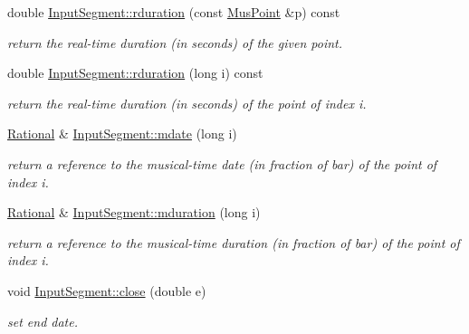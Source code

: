 \begin{DoxyCompactItemize}
\mbox{\label{group__segment_ga5ce66f635c2ab912e0ec9662c5c2ceaf}} 
double \mbox{\hyperlink{group__segment_ga5ce66f635c2ab912e0ec9662c5c2ceaf}{Input\+Segment\+::rduration}} (const \mbox{\hyperlink{classMusPoint}{Mus\+Point}} \&p) const
\begin{DoxyCompactList}\small\item\em return the real-\/time duration (in seconds) of the given point. \end{DoxyCompactList}\item 
\mbox{\label{group__segment_gafbf05e143d416de49180d2f18a53977b}} 
double \mbox{\hyperlink{group__segment_gafbf05e143d416de49180d2f18a53977b}{Input\+Segment\+::rduration}} (long i) const
\begin{DoxyCompactList}\small\item\em return the real-\/time duration (in seconds) of the point of index i. \end{DoxyCompactList}\item 
\mbox{\label{group__segment_ga6fce03f54fe517cc9541ea446cd26a50}} 
\mbox{\hyperlink{classRational}{Rational}} \& \mbox{\hyperlink{group__segment_ga6fce03f54fe517cc9541ea446cd26a50}{Input\+Segment\+::mdate}} (long i)
\begin{DoxyCompactList}\small\item\em return a reference to the musical-\/time date (in fraction of bar) of the point of index i. \end{DoxyCompactList}\item 
\mbox{\label{group__segment_ga2c16ef8a681bf9fded1dba29c1a84342}} 
\mbox{\hyperlink{classRational}{Rational}} \& \mbox{\hyperlink{group__segment_ga2c16ef8a681bf9fded1dba29c1a84342}{Input\+Segment\+::mduration}} (long i)
\begin{DoxyCompactList}\small\item\em return a reference to the musical-\/time duration (in fraction of bar) of the point of index i. \end{DoxyCompactList}\item 
\mbox{\label{group__segment_gae75db088893a7cfc719ec393e09d7ece}} 
void \mbox{\hyperlink{group__segment_gae75db088893a7cfc719ec393e09d7ece}{Input\+Segment\+::close}} (double e)
\begin{DoxyCompactList}\small\item\em set end date. \end{DoxyCompactList}\item 

\end{DoxyCompactItemize}
